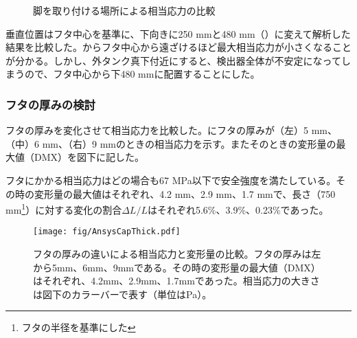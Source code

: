 \begin{figure}[htbp]
  \begin{minipage}{1\textwidth}
  \end{minipage}
  \hfill
  \begin{minipage}{0.47\textwidth}
  \end{minipage}
  \hfill
  \begin{minipage}{0.47\textwidth}
  \end{minipage}
    \caption{脚を取り付ける場所による相当応力の比較}
  \label{AnsysLeg}
\end{figure}
\fi%

垂直位置はフタ中心を基準に、下向きに250 mmと480 mm（）に変えて解析した結果を比較した。からフタ中心から遠ざけるほど最大相当応力が小さくなることが分かる。しかし、外タンク真下付近にすると、検出器全体が不安定になってしまうので、フタ中心から下480 mmに配置することにした。


\subsubsection{フタの厚みの検討}
フタの厚みを変化させて相当応力を比較した。にフタの厚みが（左）5 mm、（中）6 mm、（右）9 mmのときの相当応力を示す。またそのときの変形量の最大値（DMX）を図下に記した。

フタにかかる相当応力はどの場合も67 MPa以下で安全強度を満たしている。その時の変形量の最大値はそれぞれ、4.2 mm、2.9 mm、1.7 mmで、長さ（750 mm\footnote{フタの半径を基準にした}）に対する変化の割合$\Delta L/L$はそれぞれ5.6\%、3.9\%、0.23\%であった。

\begin{figure}[htbp]
\centering
\texttt{[image: fig/AnsysCapThick.pdf]}
\caption[フタの厚みの違いによる相当応力と変形量の比較]{フタの厚みの違いによる相当応力と変形量の比較。フタの厚みは左から5mm、6mm、9mmである。その時の変形量の最大値（DMX）はそれぞれ、4.2mm、2.9mm、1.7mmであった。相当応力の大きさは図下のカラーバーで表す（単位はPa）。}
\label{AnsysCapThick}
\end{figure}

